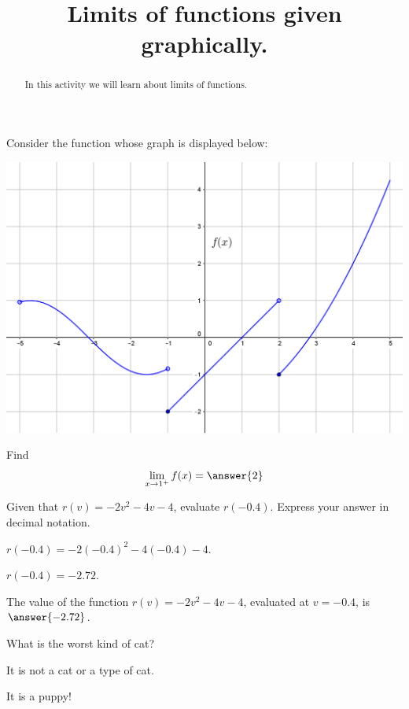 \documentclass{ximera}
\title{Limits of functions given graphically.}
\begin{document}
\begin{abstract}
In this activity we will learn about limits of functions.
\end{abstract}
\maketitle

Consider the function whose graph is displayed below:
\begin{image}
\includegraphics{pieceWise1.png}
\end{image}

\begin{exercise}
Find 
\[
\lim_{x \to 1^+} f(x)=\answer{2}
\]
\end{exercise}

\begin{exercise}
Given that $r(v)=-2 v^2-4 v-4$, evaluate $r(-0.4)$. Express your answer in decimal notation.
\begin{hint}
$r(-0.4)=-2 (-0.4)^2-4 (-0.4)-4$.
\end{hint}
\begin{hint}
$r(-0.4)=-2.72$.
\end{hint}
The value of the function $r(v)=-2 v^2-4 v-4$, evaluated at $v=-0.4$, is $\answer{-2.72}$.
\end{exercise}

\begin{question}
What is the worst kind of cat?
\begin{prompt}
\begin{multipleChoice}
\end{multipleChoice}
\end{prompt}
\begin{hint}
It is not a cat or a type of cat.
\end{hint}
\begin{hint}
It is a puppy!
\end{hint}
\end{question}
\end{document}
